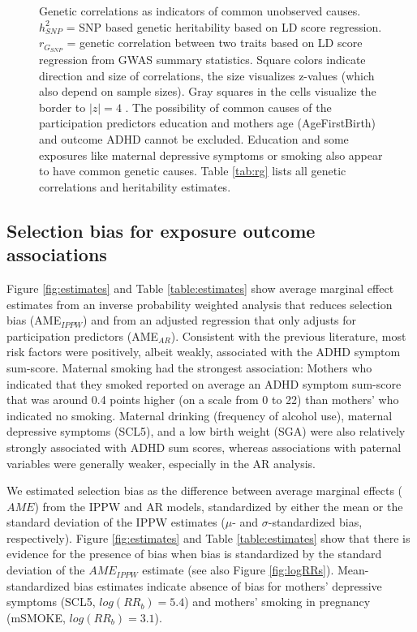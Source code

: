 \documentclass[12pt]{article}
\begin{document}
\begin{figure}
	\begin{center}
	\end{center}
	\caption{Genetic correlations as indicators of common unobserved causes. $h^2_{SNP}$ = SNP based genetic heritability based on LD score regression. $r_{G_{SNP}}$ = genetic correlation between two traits based on LD score regression from GWAS summary statistics. Square colors indicate direction and size of correlations, the size visualizes z-values (which also depend on sample sizes). Gray squares in the cells visualize the border to $|z|=4$ . The possibility of common causes of the participation predictors education and mothers age (AgeFirstBirth) and outcome ADHD cannot be excluded. Education and some exposures like maternal depressive symptoms or smoking also appear to have common genetic causes. Table \ref{tab:rg} lists all genetic correlations and heritability estimates.}
	\label{fig:rg}
\end{figure}

\subsection*{Selection bias for exposure outcome associations}
Figure \ref{fig:estimates} and Table \ref{table:estimates} show average marginal effect estimates from an inverse probability weighted analysis that reduces selection bias (AME$_{IPPW}$) and from an adjusted regression that only adjusts for participation predictors (AME$_{AR}$). Consistent with the previous literature, most risk factors were positively, albeit weakly, associated with the ADHD symptom sum-score. Maternal smoking had the strongest association: Mothers who indicated that they smoked reported on average an ADHD symptom sum-score that was around 0.4 points higher (on a scale from 0 to 22) than mothers' who indicated no smoking. Maternal drinking (frequency of alcohol use), maternal depressive symptoms (SCL5), and a low birth weight (SGA) were also relatively strongly associated with ADHD sum scores, whereas associations with paternal variables were generally weaker, especially in the AR analysis.

We estimated selection bias as the difference between average marginal effects ($AME$) from the IPPW and AR models, standardized by either the mean or the standard deviation of the IPPW estimates ($\mu$- and $\sigma$-standardized bias, respectively). Figure \ref{fig:estimates} and Table \ref{table:estimates} show that there is evidence for the presence of bias when bias is standardized by the standard deviation of the $AME_{IPPW}$ estimate (see also Figure \ref{fig:logRRs}). Mean-standardized bias estimates indicate absence of bias for mothers' depressive symptoms (SCL5, $log(RR_b)=5.4$) and mothers' smoking in pregnancy (mSMOKE, $log(RR_b)=3.1$). 
\end{document}

